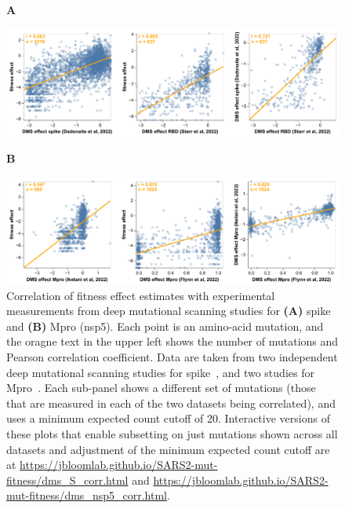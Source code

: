 \documentclass[9pt,twocolumn,twoside]{gsajnl_modified}
\begin{document}
\begin{figure}
{\bf \Large A}

\includegraphics[width=0.9\linewidth]{figs/dms_S_corr.pdf}
\vspace{0.05in}

{\bf \Large B}

\includegraphics[width=0.9\linewidth]{figs/dms_nsp5_corr.pdf}
\caption{
Correlation of fitness effect estimates with experimental measurements from deep mutational scanning studies for {\bf (A)} spike and {\bf (B)} Mpro (nsp5).
Each point is an amino-acid mutation, and the oragne text in the upper left shows the number of mutations and Pearson correlation coefficient.
Data are taken from two independent deep mutational scanning studies for spike~\citep{cite}, and two studies for Mpro~\citep{cite}.
Each sub-panel shows a different set of mutations (those that are measured in each of the two datasets being correlated), and uses a minimum expected count cutoff of 20.
Interactive versions of these plots that enable subsetting on just mutations shown across all datasets and adjustment of the minimum expected count cutoff are at \url{https://jbloomlab.github.io/SARS2-mut-fitness/dms_S_corr.html} and \url{https://jbloomlab.github.io/SARS2-mut-fitness/dms_nsp5_corr.html}.
\label{fig:dms_corr}
}
\end{figure}
\end{document}
